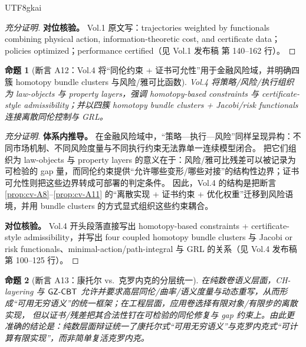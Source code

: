 \documentclass[12pt]{article}
\newtheorem{proposition}{命题}[section]
\begin{document}
\begin{CJK*}{UTF8}{gkai}
\begin{proof}[充分证明]
\textbf{对位核验。}
Vol.1 原文写：trajectories weighted by functionals combining physical action, information-theoretic cost, and certificate
  data；policies optimized；performance certified（见 Vol.1 发布稿\cite{GaoZhengAppVol1} 第 140--162 行）。
\end{proof}

\begin{proposition}[断言 A12：Vol.4 将“同伦约束 + 证书可允性”用于金融风险域，并明确四簇 homotopy bundle clusters 与风险/雅可比函数]\label{prop:cv-A12}
Vol.4 将策略/风险/执行组织为 law-objects 与 property layers，强调 homotopy-based constraints 与 certificate-style admissibility；并以四簇
  homotopy bundle clusters + Jacobi/risk functionals 连接离散同伦控制与 GRL。
\end{proposition}

\begin{proof}[充分证明]
\textbf{体系内推导。}
在金融风险域中，“策略—执行—风险”同样呈现异构：不同市场机制、不同风险度量与不同执行约束无法靠单一连续模型闭合。
把它们组织为 law-objects 与 property layers 的意义在于：风险/雅可比残差可以被记录为可检验的 gap 量，而同伦约束提供“允许哪些变形/哪些对接”的结构性边界；证书可允性则把这些边界转成可部署的判定条件。
因此，Vol.4 的结构是把断言 \ref{prop:cv-A8}--\ref{prop:cv-A11} 的“离散实现 + 证书约束 + 优化权重”迁移到风险语境，并用 bundle clusters 的方式显式组织这些约束耦合。

\textbf{对位核验。}
Vol.4 开头段落直接写出 homotopy-based constraints + certificate-style admissibility，并写出 four coupled homotopy bundle clusters 与
  Jacobi or risk functionals、minimal-action/path-integral 与 GRL 的关系（见 Vol.4 发布稿\cite{Vol4Pub} 第 100--125 行）。
\end{proof}

\begin{proposition}[断言 A13：康托尔 vs.\ 克罗内克的分层统一]\label{prop:cv-A13}
在纯数卷语义层面，CH-layering 与 $\mathsf{GZ\text{-}CBT}$ 允许并要求高层同伦/曲率/语义度量与动态重写，从而形成“可用无穷语义”的统一框架；在工程层面，应用卷选择有限对象/有限步的离散实现，
  但以证书/残差把其合法性钉在可检验的同伦修复与 gap 约束上。由此更准确的结论是：纯数层面辩证统一了康托尔式“可用无穷语义”与克罗内克式“可计算有限实现”，而非简单复活克罗内克。
\end{proposition}


\end{CJK*}
\end{document}
